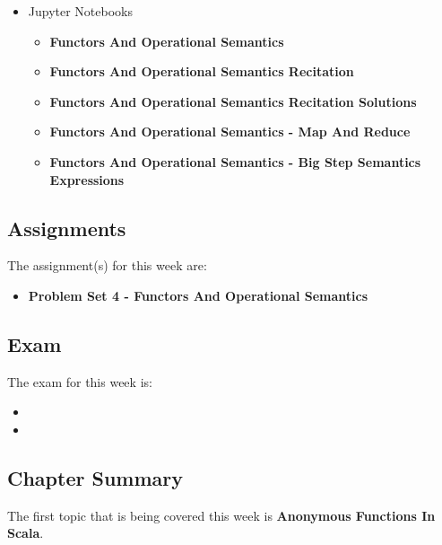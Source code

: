 \begin{itemize}
    \item Jupyter Notebooks
    \begin{itemize}
        \item \textbf{Functors And Operational Semantics}
        \item \textbf{Functors And Operational Semantics Recitation}
        \item \textbf{Functors And Operational Semantics Recitation Solutions}
        \item \textbf{Functors And Operational Semantics - Map And Reduce}
        \item \textbf{Functors And Operational Semantics - Big Step Semantics Expressions}
    \end{itemize}
\end{itemize}

\subsection{Assignments}

The assignment(s) for this week are:

\begin{itemize}
    \item \textbf{Problem Set 4 - Functors And Operational Semantics}
\end{itemize}

\subsection{Exam}

The exam for this week is:

\begin{itemize}
    \item {}
    \item {}
\end{itemize}

\subsection{Chapter Summary}

The first topic that is being covered this week is \textbf{Anonymous Functions In Scala}.

